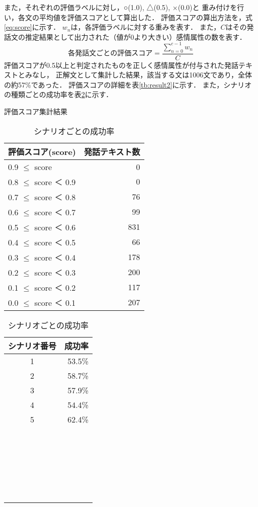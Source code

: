\documentclass[japanese]{jnlp_1.3c}
\begin{document}
また，それぞれの評価ラベルに対し，○(1.0), △(0.5), ×(0.0)と
重み付けを行い，各文の平均値を評価スコアとして算出した．
評価スコアの算出方法を，式\ref{eq:score}に示す．
$w_n$は，各評価ラベルに対する重みを表す．
また，$C$はその発話文の推定結果として出力された（値が0より大きい）感情属性の数を表す．
\begin{equation}\label{eq:score}
各発話文ごとの評価スコア = \frac{ \sum^{c-1}_{n=0} w_n }{C}
\end{equation}
評価スコアが0.5以上と判定されたものを正しく感情属性が付与された発話テキストとみなし，
正解文として集計した結果，該当する文は1006文であり，全体の約57\%であった．
評価スコアの詳細を表\ref{tb:result2}に示す．
また，シナリオの種類ごとの成功率を表\ref{tb:result3}に示す．
\begin{table}[b]
\begin{minipage}{0.45\textwidth}
\begin{center}
\caption{評価スコア集計結果}
\begin{tabular}{|l|r|}
\hline
評価スコア(score) & 発話テキスト数 \\ \hline \hline
0.9 $\leq$ score      &        0 \\ \hline
0.8 $\leq$ score ＜ 0.9 &	0 \\ \hline
0.7 $\leq$ score ＜ 0.8 &	76 \\ \hline
0.6 $\leq$ score ＜ 0.7 &	99 \\ \hline
0.5 $\leq$ score ＜ 0.6 & 	831 \\ \hline
0.4 $\leq$ score ＜ 0.5 &	66 \\ \hline
0.3 $\leq$ score ＜ 0.4 &	178 \\ \hline
0.2 $\leq$ score ＜ 0.3 &	200 \\ \hline
0.1 $\leq$ score ＜ 0.2 &	117 \\ \hline
0.0 $\leq$ score ＜ 0.1 &	207 \\ \hline
\end{tabular}
\label{tb:result2}
\end{center}
\end{minipage}
\hfill
\begin{minipage}{0.45\textwidth}
\begin{center}
\caption{シナリオごとの成功率}
\begin{tabular}{|c|r|}
\hline 
シナリオ番号 & 成功率 \\ \hline \hline
1	&	53.5\%	\\ \hline
2	&	58.7\%	\\ \hline
3	&	57.9\%	\\ \hline
4	&	54.4\%	\\ \hline
5	&	62.4\%	\\ \hline
\multicolumn{2}{c}{　}\\
\multicolumn{2}{c}{　}\\
\multicolumn{2}{c}{　}\\
\multicolumn{2}{c}{　}\\
\multicolumn{2}{c}{　}
\end{tabular}
\label{tb:result3}
\end{center}
\end{minipage}
\end{table}
\end{document}

